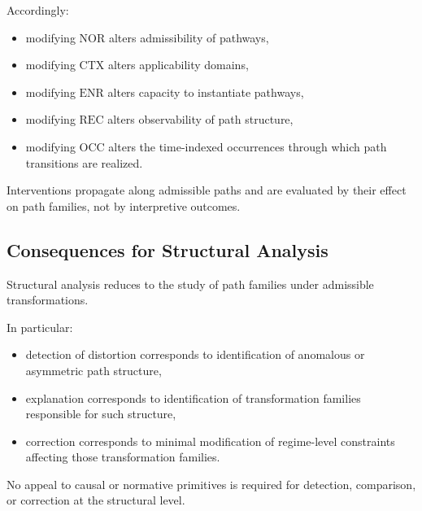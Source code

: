 Accordingly:

\begin{itemize}
  \item modifying $\mathrm{NOR}$ alters admissibility of pathways,
  \item modifying $\mathrm{CTX}$ alters applicability domains,
  \item modifying $\mathrm{ENR}$ alters capacity to instantiate pathways,
  \item modifying $\mathrm{REC}$ alters observability of path structure,
  \item modifying $\mathrm{OCC}$ alters the time-indexed occurrences
      through which path transitions are realized.
\end{itemize}

Interventions propagate along admissible paths and are evaluated
by their effect on path families, not by interpretive outcomes.

\subsection{Consequences for Structural Analysis}
\label{subsec:structural_analysis_consequences}

Structural analysis reduces to the study of path families
under admissible transformations.

In particular:

\begin{itemize}
  \item detection of distortion corresponds to identification of
        anomalous or asymmetric path structure,
  \item explanation corresponds to identification of transformation families
        responsible for such structure,
  \item correction corresponds to minimal modification of regime-level constraints
        affecting those transformation families.
\end{itemize}

No appeal to causal or normative primitives is required
for detection, comparison, or correction at the structural level.
